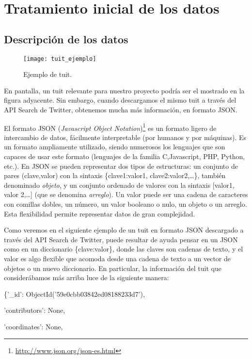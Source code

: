 \chapter{Tratamiento inicial de los datos}
\section{Descripci\'on de los datos}


\begin{wrapfigure}[17]{R}{0.5\textwidth}
\texttt{[image: tuit\_ejemplo]}
\caption{Ejemplo de tuit.}\label{fig:tuit_ejemplo}
\end{wrapfigure} 


En pantalla, un tuit relevante para nuestro proyecto podría ser el 
mostrado en la figura ad\-ya\-cente. Sin embargo, cuando descargamos el mismo tuit a través del API Search de Twitter, 
obtenemos mucha más información, en formato JSON. 

El formato JSON ({\em Javascript Object Notation})\footnote{\url{http://www.json.org/json-es.html}} 
es un formato ligero de intercambio de datos, fácilmente interpretable (por humanos y por
máquinas). Es un formato ampliamente utilizado, siendo numerosos los
lenguajes que son capaces de usar este formato (lenguajes de la familia C,Javascript, PHP, Python, etc.). 
En JSON se pueden representar dos tipos
de estructuras: un conjunto de pares (clave,valor) con la sintaxis \{clave1:valor1, clave2:valor2,\dots\}, también
denominado {\em objeto}, y un conjunto ordenado de valores con la sintaxis [valor1, valor 2,\dots] (que se denomina {\em arreglo}). 
Un valor puede ser una cadena de caracteres con comillas dobles, un número, un valor booleano o nulo, 
un objeto o un arreglo. Esta flexibilidad permite representar datos de gran complejidad.

Como veremos en el siguiente ejemplo de un tuit en formato JSON descargado a través del API Search de Twitter,
puede resultar de ayuda pensar en un JSON como en un diccionario \{clave:valor\}, donde las claves
son cadenas de texto, y el valor es algo flexible que acomoda desde una cadena de texto a un vector de objetos 
o un nuevo diccionario. En particular, la información del tuit que considerábamos más arriba 
luce de la siguiente manera:

\bigskip


\{'\_id': ObjectId('59e0cbb03842ed08188233d7'),

\quad'contributors': None,

\quad'coordinates': None,

